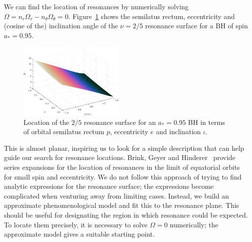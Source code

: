 \documentclass[aps,prd,amsfonts,amssymb,amsmath,nofootinbib,showpacs,superscriptaddress,twocolumn,floatfix]{revtex4-1}
\newcommand{\Figref}[1]{Figure~\ref{fig:#1}}
\begin{document}
We can find the location of resonances by numerically solving $\Omega = n_r \Omega_r - n_\theta \Omega_\theta = 0$. \Figref{res-plane-2-5-95} shows the semilatus rectum, eccentricity and (cosine of the) inclination angle of the $\nu = 2/5$ resonance surface for a BH of spin $a_\ast = 0.95$. 
\begin{figure}
\centering
\includegraphics[width=0.46\textwidth]{Fig_res-2-5-95-plane}
\caption{\label{fig:res-plane-2-5-95}Location of the $2/5$ resonance surface for an $a_\ast = 0.95$ BH in terms of orbital semilatus rectum $p$, eccentricity $e$ and inclination $\iota$.}
\end{figure}
This is almost planar, inspiring us to look for a simple description that can help guide our search for resonance locations. Brink, Geyer and Hinderer~\cite{Brink2013} provide series expansions for the location of resonances in the limit of equatorial orbits for small spin and eccentricity. We do not follow this approach of trying to find analytic expressions for the resonance surface; the expressions become complicated when venturing away from limiting cases. Instead, we build an approximate phenomenological model and fit this to the resonance plane. %
This should be useful for designating the region in which resonance could be expected. To locate them precisely, it is necessary to solve $\Omega = 0$ numerically; the approximate model gives a suitable starting point.
\end{document}
